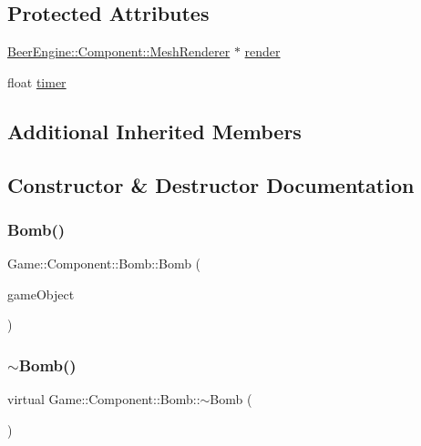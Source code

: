 \subsection*{Protected Attributes}
\begin{DoxyCompactItemize}
\item 
\mbox{\hyperlink{class_beer_engine_1_1_component_1_1_mesh_renderer}{Beer\+Engine\+::\+Component\+::\+Mesh\+Renderer}} $\ast$ \mbox{\hyperlink{class_game_1_1_component_1_1_bomb_ae70ae4cc38793d675183efa64ac25f36}{render}}
\item 
float \mbox{\hyperlink{class_game_1_1_component_1_1_bomb_a4c1dc12e98181874a406edd83b98ffa1}{timer}}
\end{DoxyCompactItemize}
\subsection*{Additional Inherited Members}


\subsection{Constructor \& Destructor Documentation}
\mbox{\label{class_game_1_1_component_1_1_bomb_aed38ca47ddf849382948b02485be41f8}} 
\subsubsection{\texorpdfstring{Bomb()}{Bomb()}}
{\footnotesize\ttfamily Game\+::\+Component\+::\+Bomb\+::\+Bomb (\begin{DoxyParamCaption}\item[{\mbox{\hyperlink{class_beer_engine_1_1_game_object}{Beer\+Engine\+::\+Game\+Object}} $\ast$}]{game\+Object }\end{DoxyParamCaption})}

\mbox{\label{class_game_1_1_component_1_1_bomb_a08d967ddfb90d063b71270ce6d087c2f}} 
\subsubsection{\texorpdfstring{$\sim$\+Bomb()}{~Bomb()}}
{\footnotesize\ttfamily virtual Game\+::\+Component\+::\+Bomb\+::$\sim$\+Bomb (\begin{DoxyParamCaption}\item[{void}]{ }\end{DoxyParamCaption})\hspace{0.3cm}{\ttfamily [virtual]}}



